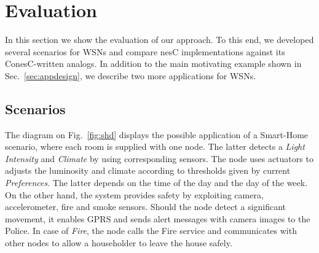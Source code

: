 \section{Evaluation}\label{sec:eval}

In this section we show the evaluation of our approach. To this end, we
developed several scenarios for WSNs and compare nesC implementations against
its ConesC-written analogs. In addition to the main motivating example shown
in Sec.~\ref{sec:appdesign}, we describe two more applications for WSNs.

\subsection{Scenarios}\label{sec:scenarios}

The diagram on Fig.~\ref{fig:shd} displays the possible application of a
Smart-Home scenario, where each room is supplied with one node. The latter
detects a \emph{Light Intensity} and \emph{Climate} by using corresponding
sensors. The node uses actuators to adjusts the luminosity and climate according
to thresholds given by current \emph{Preferences}. The latter depends on the
time of the day and the day of the week. On the other hand, the system
provides safety by exploiting camera, accelerometer, fire and smoke sensors.
Should the node detect a significant movement, it enables GPRS and sends alert
messages with camera images to the Police. In case of \emph{Fire}, the node
calls the Fire service and communicates with other nodes to allow a householder
to leave the house safely.


